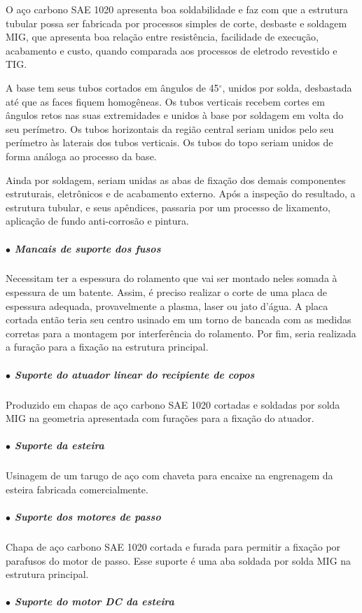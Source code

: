 O aço carbono SAE 1020 apresenta boa soldabilidade e faz com que a estrutura tubular possa ser fabricada por processos simples de corte, desbaste e soldagem MIG, que apresenta boa relação entre resistência, facilidade de execução, acabamento e custo, quando comparada aos processos de eletrodo revestido e TIG.

A base tem seus tubos cortados em ângulos de 45$^{\circ}$, unidos por solda, desbastada até que as faces fiquem homogêneas. Os tubos verticais recebem cortes em ângulos retos nas suas extremidades e unidos à base por soldagem em volta do seu perímetro. Os tubos horizontais da região central seriam unidos pelo seu perímetro às laterais dos tubos verticais. Os tubos do topo seriam unidos de forma análoga ao processo da base.

Ainda por soldagem, seriam unidas as abas de fixação dos demais componentes estruturais, eletrônicos e de acabamento externo. Após a inspeção do resultado, a estrutura tubular, e seus apêndices, passaria por um processo de lixamento, aplicação de fundo anti-corrosão e pintura.

\subparagraph*{$\bullet$ Mancais de suporte dos fusos} \hfill

Necessitam ter a espessura do rolamento que vai ser montado neles somada à espessura de um batente. Assim, é preciso realizar o corte de uma placa de espessura adequada, provavelmente a plasma, laser ou jato d'água. A placa cortada então teria seu centro usinado em um torno de bancada com as medidas corretas para a montagem por interferência do rolamento. Por fim, seria realizada a furação para a fixação na estrutura principal.

\subparagraph*{$\bullet$ Suporte do atuador linear do recipiente de copos} \hfill

Produzido em chapas de aço carbono SAE 1020 cortadas e soldadas por solda MIG na geometria apresentada com furações para a fixação do atuador.

\subparagraph*{$\bullet$ Suporte da esteira} \hfill

Usinagem de um tarugo de aço com chaveta para encaixe na engrenagem da esteira fabricada comercialmente.

\subparagraph*{$\bullet$ Suporte dos motores de passo} \hfill

Chapa de aço carbono SAE 1020 cortada e furada para permitir a fixação por parafusos do motor de passo. Esse suporte é uma aba soldada por solda MIG na estrutura principal.

\subparagraph*{$\bullet$ Suporte do motor DC da esteira} \hfill

